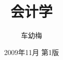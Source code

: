 \documentclass[10pt,a4paper,oneside]{book}
\begin{document}
	\title{会计学} 
	\author{车幼梅}
	\date{2009年11月 第1版}

	\frontmatter

	\maketitle

	
	\tableofcontents %

	\cleardoublepage
	\mainmatter
	\pagestyle{plain}

	
	
\end{document}
